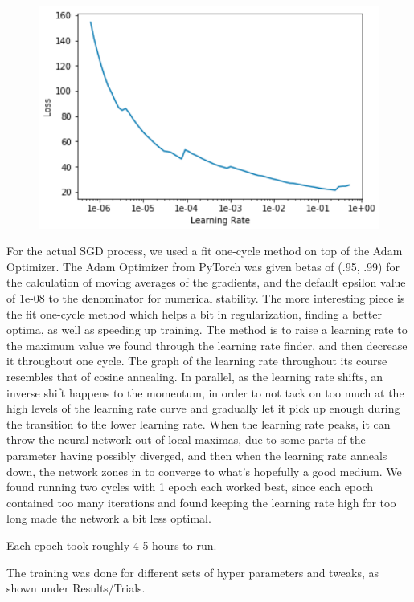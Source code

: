 \documentclass[10pt,twocolumn,letterpaper]{article}
\begin{document}
  \begin{figure}[]
    \centering
    \includegraphics[width=0.8\linewidth]{img/learningRate.png}
    \label{learningRate}
  \end{figure}

  For the actual SGD process, we used a fit one-cycle method on top of the Adam
  Optimizer. The Adam Optimizer from PyTorch was given betas of (.95, .99) for
  the calculation of moving averages of the gradients, and the default epsilon
  value of 1e-08 to the denominator for numerical stability. The more
  interesting piece is the fit one-cycle method which helps a bit in
  regularization, finding a better optima, as well as speeding up training. The
  method is to raise a learning rate to the maximum value we found through the
  learning rate finder, and then decrease it throughout one cycle. The graph of
  the learning rate throughout its course resembles that of cosine annealing. In
  parallel, as the learning rate shifts, an inverse shift happens to the
  momentum, in order to not tack on too much at the high levels of the learning
  rate curve and gradually let it pick up enough during the transition to the
  lower learning rate. When the learning rate peaks, it can throw the neural
  network out of local maximas, due to some parts of the parameter having possibly
  diverged, and then when the learning rate anneals down, the network
  zones in to converge to what’s hopefully a good medium. We found running two
  cycles with 1 epoch each worked best, since each epoch contained too many
  iterations and found keeping the learning rate high for too long made the
  network a bit less optimal.

  Each epoch took roughly 4-5 hours to run.

  The training was done for different sets of hyper parameters and tweaks, as
  shown under Results/Trials.
\end{document}
